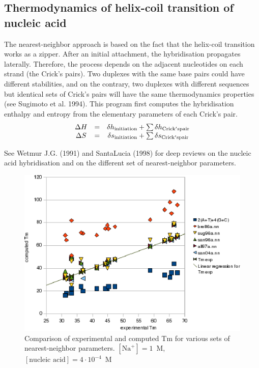 \documentclass{article}
\begin{document}
\subsection{Thermodynamics of helix-coil transition of nucleic acid}  
The nearest-neighbor approach is based on the fact that the helix-coil
transition works as a zipper. After an initial attachment, the hybridisation
propagates laterally.  Therefore, the process depends on the adjacent
nucleotides on each strand (the Crick's pairs).  Two duplexes with the same base
pairs could have different stabilities, and on the contrary, two duplexes with
different sequences but identical sets of Crick's pairs will have the same
thermodynamics properties (see Sugimoto et al. 1994).  This program first
computes the hybridisation enthalpy and entropy from the elementary parameters
of each Crick's pair.
\begin{displaymath}
  \begin{array}[t]{ccc}
  \Delta{}H&=&\delta{}h_\mathrm{initiation}+\sum \delta{}h_\mathrm{Crick's pair}\\
  \Delta{}S&=&\delta{}s_\mathrm{initiation}+\sum \delta{}s_\mathrm{Crick's pair}
  \end{array}
\end{displaymath}
   
See Wetmur J.G. (1991) and SantaLucia (1998) 
for deep reviews on the nucleic  acid hybridisation and on the different 
set of nearest-neighbor parameters.    

\begin{figure}
\caption{Comparison of experimental and computed Tm for various sets of
  nearest-neighbor parameters. $[\mbox{Na}^+] = 1$~M, $[\mbox{nucleic acid}] = 4\cdot{}10^{-4}$~M}
\includegraphics{image1M.eps}
\end{figure}
\end{document}
